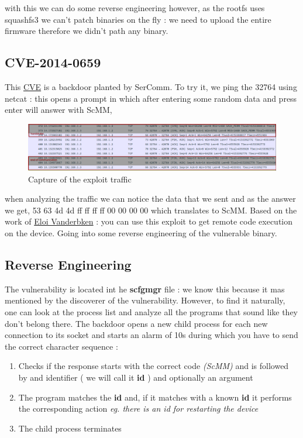 \documentclass{article}
\begin{document}
with this we can do some reverse engineering however, as the rootfs uses squashfs3 we can't patch binaries on the fly : we need to upload the entire firmware therefore we didn't path any binary.
\subsection{CVE-2014-0659}
This \href{https://nvd.nist.gov/vuln/detail/CVE-2014-0659}{CVE} is a backdoor planted by SerComm. To try it, we ping the 32764 using netcat : this opens a prompt in which after entering some random data and press enter will answer with ScMM,
\begin{figure}[!ht]
	\centering
	\includegraphics[width=\textwidth]{example.png}
	\caption{Capture of the exploit traffic}
\end{figure}
when analyzing the traffic we can notice the data that we sent and as the answer we get, 53 63 4d 4d ff ff ff ff 00 00 00 00 which translates to ScMM. Based on the work of \href{https://github.com/elvanderb/TCP-32764}{Eloi Vanderbken} : you can use this exploit to get remote code execution on the device. Going into some reverse engineering of the vulnerable binary.
\subsection{Reverse Engineering}
The vulnerability is located int he \textbf{scfgmgr} file : we know this because it mas mentioned by the discoverer of the vulnerability. However, to find it naturally, one can look at the process list and analyze all the programs that sound like they don't belong there. The backdoor opens a new child process for each new connection to its socket and starts an alarm of 10s during which you have to send the correct character sequence : 
\begin{enumerate}
	\item Checks if the response starts with the correct code \textit{(ScMM)} and is followed by and identifier ( we will call it \textbf{id} ) and optionally an argument
	\item The program matches the \textbf{id} and, if it matches with a known \textbf{id} it performs the corresponding action \textit{eg. there is an id for restarting the device}
	\item The child process terminates
\end{enumerate}
\end{document}
